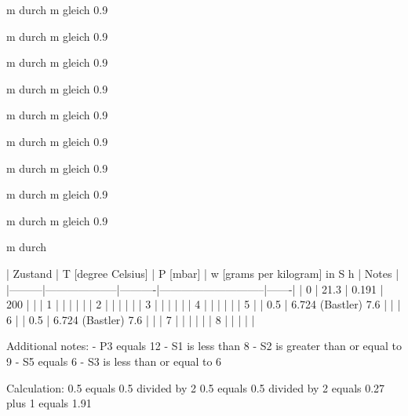 m durch m gleich 0.9

m durch m gleich 0.9

m durch m gleich 0.9

m durch m gleich 0.9

m durch m gleich 0.9

m durch m gleich 0.9

m durch m gleich 0.9

m durch m gleich 0.9

m durch m gleich 0.9

m durch

| Zustand | T [degree Celsius] | P [mbar] | w [grams per kilogram] in S h | Notes |
|---------|--------------------|----------|-----------------------------|-------|
| 0       | 21.3               | 0.191    | 200                         |       |
| 1       |                    |          |                             |       |
| 2       |                    |          |                             |       |
| 3       |                    |          |                             |       |
| 4       |                    |          |                             |       |
| 5       |                    | 0.5      | 6.724 (Bastler) 7.6         |       |
| 6       |                    | 0.5      | 6.724 (Bastler) 7.6         |       |
| 7       |                    |          |                             |       |
| 8       |                    |          |                             |       |

Additional notes:
- P3 equals 12
- S1 is less than 8
- S2 is greater than or equal to 9
- S5 equals 6
- S3 is less than or equal to 6

Calculation:
0.5 equals 0.5 divided by 2
0.5 equals 0.5 divided by 2 equals 0.27 plus 1 equals 1.91

